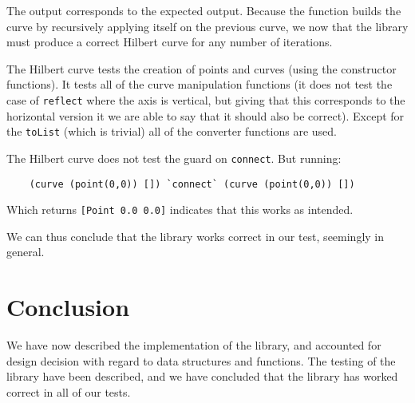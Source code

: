 \documentclass[a4paper, 11pt]{article}
\begin{document}
The output corresponds to the expected output. Because the function builds the curve by recursively applying itself on the previous curve, we now that the library must produce a correct Hilbert curve for any number of iterations.

The Hilbert curve tests the creation of points and curves (using the constructor functions). It tests all of the curve manipulation functions (it does not test the case of \texttt{reflect} where the axis is vertical, but giving that this corresponds to the horizontal version it we are able to say that it should also be correct). Except for the \texttt{toList} (which is trivial) all of the converter functions are used.

The Hilbert curve does not test the guard on \texttt{connect}. But running:

\begin{verbatim}
    (curve (point(0,0)) []) `connect` (curve (point(0,0)) [])
\end{verbatim}

Which returns \texttt{[Point 0.0 0.0]} indicates that this works as intended.

We can thus conclude that the library works correct in our test, seemingly in general.

\section{Conclusion} %
\label{sec:conclusion}
We have now described the implementation of the library, and accounted for design decision with regard to data structures and functions. The testing of the library have been described, and we have concluded that the library has worked correct in all of our tests.
\end{document}
